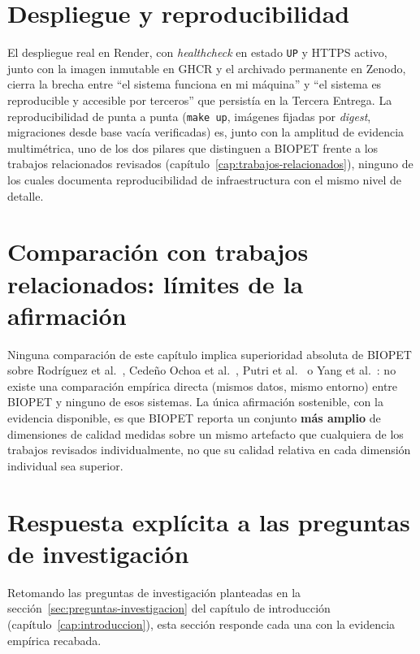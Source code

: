 \section{Despliegue y reproducibilidad}

El despliegue real en Render, con \emph{healthcheck} en estado \texttt{UP}
y HTTPS activo, junto con la imagen inmutable en GHCR y el archivado
permanente en Zenodo, cierra la brecha entre ``el sistema funciona en mi
m\'aquina'' y ``el sistema es reproducible y accesible por terceros'' que
persist\'ia en la Tercera Entrega. La reproducibilidad de punta a punta
(\texttt{make up}, im\'agenes fijadas por \emph{digest}, migraciones desde
base vac\'ia verificadas) es, junto con la amplitud de evidencia
multim\'etrica, uno de los dos pilares que distinguen a BIOPET frente a
los trabajos relacionados revisados (cap\'itulo~\ref{cap:trabajos-relacionados}),
ninguno de los cuales documenta reproducibilidad de infraestructura con el
mismo nivel de detalle.

\section{Comparaci\'on con trabajos relacionados: l\'imites de la afirmaci\'on}

Ninguna comparaci\'on de este cap\'itulo implica superioridad absoluta de
BIOPET sobre Rodr\'iguez et al.~\cite{rodriguez2024oscrum}, Cede\~no Ochoa
et al.~\cite{cedeno2021veterinaria}, Putri et al.~\cite{putri2017perftesting}
o Yang et al.~\cite{yang2026tokentimebomb}: no existe una comparaci\'on
emp\'irica directa (mismos datos, mismo entorno) entre BIOPET y ninguno de
esos sistemas. La \'unica afirmaci\'on sostenible, con la evidencia
disponible, es que BIOPET reporta un conjunto \textbf{m\'as amplio} de
dimensiones de calidad medidas sobre un mismo artefacto que cualquiera de
los trabajos revisados individualmente, no que su calidad relativa en cada
dimensi\'on individual sea superior.

\section{Respuesta expl\'icita a las preguntas de investigaci\'on}
\label{sec:respuestas-rq}

Retomando las preguntas de investigaci\'on planteadas en la
secci\'on~\ref{sec:preguntas-investigacion} del cap\'itulo de
introducci\'on (cap\'itulo~\ref{cap:introduccion}), esta secci\'on
responde cada una con la evidencia emp\'irica recabada.

